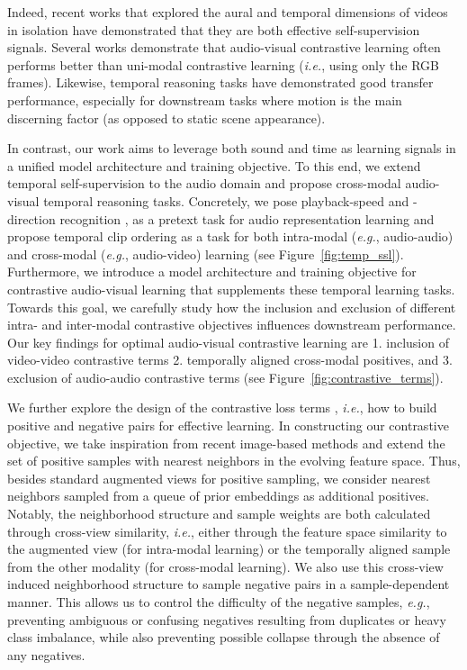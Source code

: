 \documentclass[letterpaper]{article}
\newcommand{\eg}{\emph{e.g.}}
\newcommand{\ie}{\emph{i.e.}}
\begin{document}
Indeed, recent works that explored the aural and temporal dimensions of videos in isolation have demonstrated that they are both effective self-supervision signals.
Several works \cite{Morgado_2021_CVPR,patrick2020multi,alwassel2019self} demonstrate that audio-visual contrastive learning often performs better than uni-modal contrastive learning (\ie, using only the RGB frames).
Likewise, temporal reasoning tasks \cite{misra2016shuffle,jenni2021time,dave2021tclr} have demonstrated good transfer performance, especially for downstream tasks where motion is the main discerning factor (as opposed to static scene appearance).

In contrast, our work aims to leverage both sound and time as learning signals in a unified model architecture and training objective.
To this end, we extend temporal self-supervision to the audio domain and propose cross-modal audio-visual temporal reasoning tasks.
Concretely, we pose playback-speed and -direction recognition \cite{wei2018learning,benaim2020speednet,jenni2020video}, as a pretext task for audio representation learning and propose temporal clip ordering as a task for both intra-modal (\eg, audio-audio) and cross-modal (\eg, audio-video) learning (see Figure~\ref{fig:temp_ssl}).
Furthermore, we introduce a model architecture and training objective for contrastive audio-visual learning that supplements these temporal learning tasks.
Towards this goal, we carefully study how the inclusion and exclusion of different intra- and inter-modal contrastive objectives influences downstream performance.
Our key findings for optimal audio-visual contrastive learning are 1. inclusion of video-video contrastive terms 2. temporally aligned cross-modal positives, and 3. exclusion of audio-audio contrastive terms (see Figure~\ref{fig:contrastive_terms}).

We further explore the design of the contrastive loss terms \cite{wu2018unsupervised}, \ie, how to build positive and negative pairs for effective learning.
In constructing our contrastive objective, we take inspiration from recent image-based methods \cite{dwibedi2021little,koohpayegani2021mean} and extend the set of positive samples with nearest neighbors in the evolving feature space.
Thus, besides standard augmented views for positive sampling, we consider nearest neighbors sampled from a queue of prior embeddings as additional positives.
Notably, the neighborhood structure and sample weights are both calculated through cross-view similarity, \ie, either through the feature space similarity to the augmented view (for intra-modal learning) or the temporally aligned sample from the other modality (for cross-modal learning).
We also use this cross-view induced neighborhood structure to sample negative pairs in a sample-dependent manner.
This allows us to control the difficulty of the negative samples, \eg, preventing ambiguous or confusing negatives resulting from duplicates or heavy class imbalance, while also preventing possible collapse through the absence of any negatives.
\end{document}
